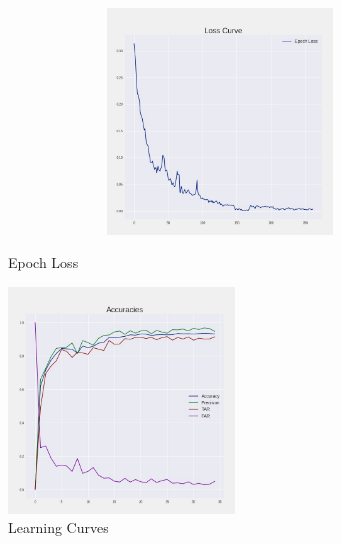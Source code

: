 \documentclass[aps,prb,twocolumn,superscriptaddress,floatfix,longbibliography, nofootinbib]{revtex4-2}
\begin{document}
\begin{figure}[t!]
    \begin{minipage}[b]{0.45\linewidth}
    \centering
    \includegraphics[clip=true,width=1.1\textwidth, height=6cm]{LFWfinal_epochloss.jpeg}
    \caption{Epoch Loss}
     \label{fig:epoch_loss}
     \end{minipage}
     \hspace{1cm}
    \begin{minipage}[b]{0.45\linewidth}
    \centering
    \includegraphics[clip=true,width=\textwidth, height=6cm]{LFWfinal_acc.jpeg}
    \caption{Learning Curves}
    \label{fig:acc}
    \end{minipage}
\end{figure}
\end{document}
